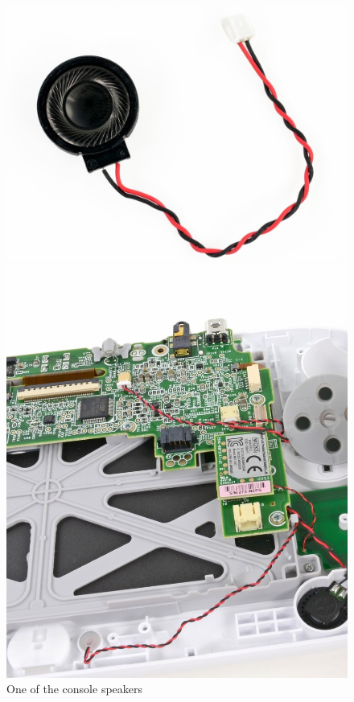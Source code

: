 \documentclass[11pt,a4paper,titlepage]{article}
\begin{document}
        \begin{figure}[h]
          \begin{minipage}{.5 \textwidth}
            \centering
            \includegraphics[width = \textwidth]{speaker.png}
            \caption{One of the console speakers}
            \label{fig:speaker}
          \end{minipage}
          \vspace{5mm}
          \begin{minipage}{.5 \textwidth}
            \centering
            \includegraphics[width = .8\textwidth]{buttons.png}

\end{minipage}
\end{figure}
\end{document}
